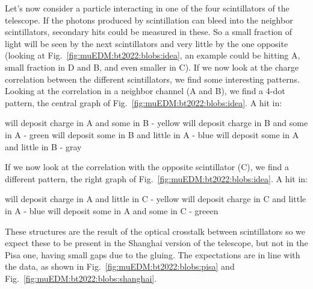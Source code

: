 \begin{refsection}
            \noindent
            Let's now consider a particle interacting in one of the four scintillators of the telescope. 
            If the photons produced by scintillation can bleed into the neighbor scintillators, secondary hits could be measured in these.
            So a small fraction of light will be seen by the next scintillators and very little by the one opposite (looking at Fig.~\ref{fig:muEDM:bt2022:blobs:idea}, an example could be hitting A, small fraction in D and B, and even smaller in C).
            If we now look at the charge correlation between the different scintillators, we find some interesting patterns.
            Looking at the correlation in a neighbor channel (A and B), we find a 4-dot pattern, the central graph of Fig.~\ref{fig:muEDM:bt2022:blobs:idea}. A hit in:
            \begin{outline}
                \1[A] will deposit charge in A and some in B - yellow
                \1[B] will deposit charge in B and some in A - green
                \1[C] will deposit some in B and little in A - blue
                \1[D] will deposit some in A and little in B - gray
            \end{outline} 
            If we now look at the correlation with the opposite scintillator (C), we find a different pattern, the right graph of Fig.~\ref{fig:muEDM:bt2022:blobs:idea}.
            A hit in:
            \begin{outline}
                \1[A] will deposit charge in A and little in C - yellow
                \1[C] will deposit charge in C and little in A - blue
                \1[B/D] will deposit some in A and some in C - greeen
            \end{outline} 
            These structures are the result of the optical crosstalk between scintillators so we expect these to be present in the Shanghai version of the telescope, but not in the Pisa one, having small gaps due to the gluing.
            The expectations are in line with the data, as shown in Fig.~\ref{fig:muEDM:bt2022:blobs:pisa} and Fig.~\ref{fig:muEDM:bt2022:blobs:shanghai}. 
        \begin{figure}   
            \centering
            \\

\end{figure}
\end{refsection}
